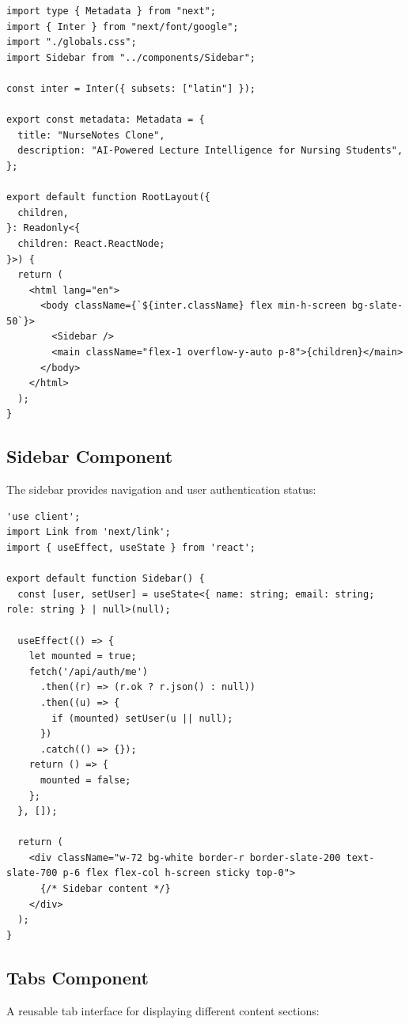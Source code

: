 \documentclass[12pt,a4paper]{article}
\begin{document}
\begin{lstlisting}[caption=Root Layout Component]
import type { Metadata } from "next";
import { Inter } from "next/font/google";
import "./globals.css";
import Sidebar from "../components/Sidebar";

const inter = Inter({ subsets: ["latin"] });

export const metadata: Metadata = {
  title: "NurseNotes Clone",
  description: "AI-Powered Lecture Intelligence for Nursing Students",
};

export default function RootLayout({
  children,
}: Readonly<{
  children: React.ReactNode;
}>) {
  return (
    <html lang="en">
      <body className={`${inter.className} flex min-h-screen bg-slate-50`}>
        <Sidebar />
        <main className="flex-1 overflow-y-auto p-8">{children}</main>
      </body>
    </html>
  );
}
\end{lstlisting}

\subsection{Sidebar Component}

The sidebar provides navigation and user authentication status:

\begin{lstlisting}[caption=Sidebar Component Structure]
'use client';
import Link from 'next/link';
import { useEffect, useState } from 'react';

export default function Sidebar() {
  const [user, setUser] = useState<{ name: string; email: string; role: string } | null>(null);

  useEffect(() => {
    let mounted = true;
    fetch('/api/auth/me')
      .then((r) => (r.ok ? r.json() : null))
      .then((u) => {
        if (mounted) setUser(u || null);
      })
      .catch(() => {});
    return () => {
      mounted = false;
    };
  }, []);

  return (
    <div className="w-72 bg-white border-r border-slate-200 text-slate-700 p-6 flex flex-col h-screen sticky top-0">
      {/* Sidebar content */}
    </div>
  );
}
\end{lstlisting}

\subsection{Tabs Component}

A reusable tab interface for displaying different content sections:
\end{document}
